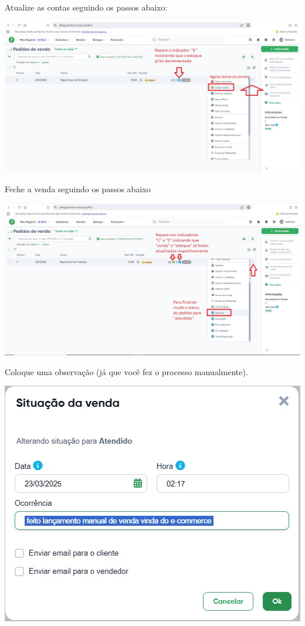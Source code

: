 \documentclass[
]{book}
\begin{document}
Atualize as contas seguindo os passos abaixo:

\includegraphics{images/np1/112-ERP_liberar_venda4.jpg}

Feche a venda seguindo os passos abaixo

\includegraphics{images/np1/113-ERP_liberar_venda5.jpg}

Coloque uma observação (já que você fez o processo manualmente).

\includegraphics{images/np1/114-ERP_liberar_venda6.jpg}
\end{document}

